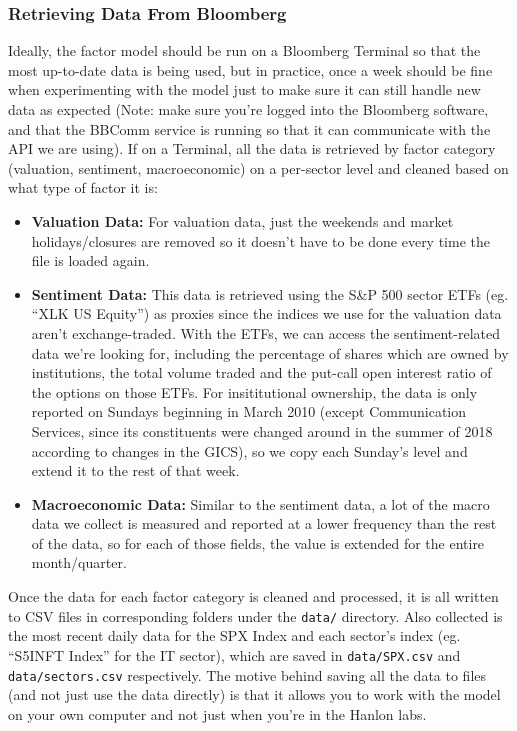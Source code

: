 \documentclass[]{article}
\begin{document}
\hypertarget{retrieving-data-from-bloomberg}{%
\subsubsection{Retrieving Data From
Bloomberg}\label{retrieving-data-from-bloomberg}}

Ideally, the factor model should be run on a Bloomberg Terminal so that
the most up-to-date data is being used, but in practice, once a week
should be fine when experimenting with the model just to make sure it
can still handle new data as expected (Note: make sure you're logged
into the Bloomberg software, and that the BBComm service is running so
that it can communicate with the API we are using). If on a Terminal,
all the data is retrieved by factor category (valuation, sentiment,
macroeconomic) on a per-sector level and cleaned based on what type of
factor it is:

\begin{itemize}
\item
  \textbf{Valuation Data:} For valuation data, just the weekends and
  market holidays/closures are removed so it doesn't have to be done
  every time the file is loaded again.
\item
  \textbf{Sentiment Data:} This data is retrieved using the S\&P 500
  sector ETFs (eg. ``XLK US Equity'') as proxies since the indices we
  use for the valuation data aren't exchange-traded. With the ETFs, we
  can access the sentiment-related data we're looking for, including the
  percentage of shares which are owned by institutions, the total volume
  traded and the put-call open interest ratio of the options on those
  ETFs. For insititutional ownership, the data is only reported on
  Sundays beginning in March 2010 (except Communication Services, since
  its constituents were changed around in the summer of 2018 according
  to changes in the GICS), so we copy each Sunday's level and extend it
  to the rest of that week.
\item
  \textbf{Macroeconomic Data:} Similar to the sentiment data, a lot of
  the macro data we collect is measured and reported at a lower
  frequency than the rest of the data, so for each of those fields, the
  value is extended for the entire month/quarter.
\end{itemize}

Once the data for each factor category is cleaned and processed, it is
all written to CSV files in corresponding folders under the
\texttt{data/} directory. Also collected is the most recent daily data
for the SPX Index and each sector's index (eg. ``S5INFT Index'' for the
IT sector), which are saved in \texttt{data/SPX.csv} and
\texttt{data/sectors.csv} respectively. The motive behind saving all the
data to files (and not just use the data directly) is that it allows you
to work with the model on your own computer and not just when you're in
the Hanlon labs.
\end{document}
